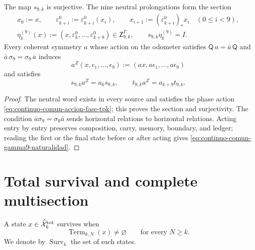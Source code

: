 \begin{proposition}
\label{prop:continuo-comun-gamma9-total-natural}
The map \(s_{9,k}\) is surjective. The nine neutral prolongations form
the section
\begin{equation}
\label{eq:continuo-comun-gamma9-seccion-neutra}
 \begin{gathered}
 x_0:=x,\qquad
 \varepsilon^0_{k+i}:=\varepsilon^0_{k+i}(x_i),\qquad
 x_{i+1}:=(\varepsilon^0_{k+i})_*x_i\quad(0\leq i<9),\\
 \eta^{(9)}_k(x):=
 (x,\varepsilon^0_k,\ldots,\varepsilon^0_{k+8})
 \in\mathsf Z^{\Gamma}_{9,k},
 \qquad s_{9,k}\eta^{(9)}_k=I.
 \end{gathered}
\end{equation}
Every coherent symmetry \(a\) whose action on the odometer satisfies
\(\mathsf Q\,a=\bar a\,\mathsf Q\) and
\(\bar a\,\sigma_9=\sigma_9\,\bar a\) induces
\[
 a^Z(x,\epsilon_1,\ldots,\epsilon_9)
 :=(a x,a\epsilon_1,\ldots,a\epsilon_9)
\]
and satisfies
\begin{equation}
\label{eq:continuo-comun-gamma9-naturalidad}
 s_{9,k}a^Z=a_ks_{9,k},
 \qquad
 t_{9,k}a^Z=a_{k+9}t_{9,k}.
\end{equation}
\end{proposition}

\begin{proof}
The neutral word exists in every source and satisfies the phase action \eqref{eq:continuo-comun-accion-fase-tpk}; this proves the section and surjectivity. The condition \(\bar a\sigma_9=\sigma_9\bar a\) sends horizontal relations to horizontal relations. Acting entry by entry preserves composition, carry, memory, boundary, and ledger; reading the first or the final state before or after acting gives \eqref{eq:continuo-comun-gamma9-naturalidad}.
\end{proof}

\section{Total survival and complete multisection}
\label{sec:continuo-comun-supervivencia}

\begin{definition}
\label{def:continuo-comun-supervivencia}
A state \(x\in\widehat{\mathcal X}^{\rm tot}_k\) survives when
\begin{equation}
\label{eq:continuo-comun-supervivencia}
 \operatorname{Term}_{k,N}(x)\neq\varnothing
 \qquad\text{for every }N\geq k.
\end{equation}
We denote by \(\operatorname{Surv}_k\) the set of such states.
\end{definition}

